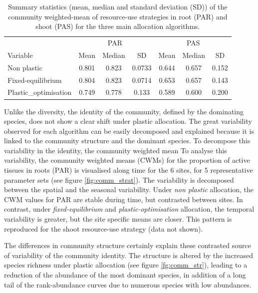 \begin{table}[]
\centering
\caption[Tissue resource-use strategy at the community level]{Summary statistics (mean, median and standard deviation (SD)) of the community weighted-mean of resource-use strategies in root (PAR) and shoot (PAS) for the three main allocation algorithms.}
\label{table:comm_strat}
\begin{tabular}{l|ccc|ccc}
                      & \multicolumn{3}{c}{PAR} & \multicolumn{3}{c}{PAS} \\
Variable              & Mean  & Median & SD     & Mean   & Median  & SD    \\ \hline
Non plastic           & 0.801 & 0.823  & 0.0733 & 0.644  & 0.657   & 0.152 \\
Fixed-equilibrium     & 0.804 & 0.823  & 0.0714 & 0.653  & 0.657   & 0.143 \\
Plastic\_optimisation & 0.749 & 0.778  & 0.133  & 0.589  & 0.600   & 0.200
\end{tabular}
\end{table}


Unlike the diversity, the identity of the community, defined by the dominating species, does not show a clear shift under plastic allocation. The great variability observed for each algorithm can be easily decomposed and explained because it is linked to the community structure and the dominant species. To decompose this variability in the identity, the community weighted mean 
To analyse this variability, the community weighted means (CWMs) for the proportion of active tissues in roots (PAR) is visualised along time for the 6 sites, for 5 representative parameter sets (see figure \ref{fig:comm_strat}). The variability is decomposed between the spatial and the seasonal variability. Under \textit{non plastic} allocation, the CWM values for PAR are stable during time, but contrasted between sites. In contrast, under \textit{fixed-equilibrium} and \textit{plastic-optimisation} allocation, the temporal variability is greater, but the site specific means are closer. This pattern is reproduced for the shoot resource-use strategy (data not shown).


The differences in community structure certainly explain these contrasted source of variability of the community identity. The structure is altered by the increased species richness under plastic allocation (see figure \ref{fg:comm_str}), leading to a reduction of the abundance of the most dominant species, in addition of a long tail of the rank-abundance curves due to numerous species with low abundances.

